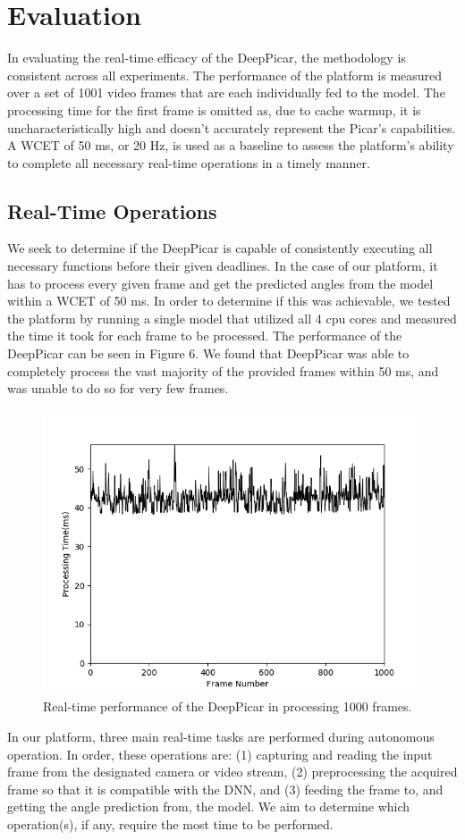 
\section{Evaluation}\label{sec:evaluation}

In evaluating the real-time efficacy of the DeepPicar, the methodology is consistent across all 
experiments. The performance of the platform is measured over a set of 1001 video frames that are 
each individually fed to the model. The processing time for the first frame is omitted as, due to 
cache warmup, it is uncharacteristically high and doesn't accurately represent the Picar's capabilities. 
A WCET of 50 ms, or 20 Hz, is used as a baseline to assess the platform's ability to complete all 
necessary real-time operations in a timely manner.

\subsection{Real-Time Operations}
We seek to determine if the DeepPicar is capable of consistently executing all necessary functions 
before their given deadlines. In the case of our platform, it has to process every given frame and get 
the predicted angles from the model within a WCET of 50 ms. In order to determine if this was achievable, 
we tested the platform by running a single model that utilized all 4 cpu cores and measured the time it 
took for each frame to be processed. The performance of the DeepPicar can be seen in Figure 6. We found 
that DeepPicar was able to completely process the vast majority of the provided frames within 50 ms, and 
was unable to do so for very few frames.

\begin{figure}[h]
  \centering
  \includegraphics[width=.5\textwidth]{Total_Processing_Time}
  \caption{ Real-time performance of the DeepPicar in processing 1000 frames.}
\end{figure}

In our platform, three main real-time tasks are performed during autonomous operation. In order, these 
operations are: (1) capturing and reading the input frame from the designated camera or video stream, 
(2) preprocessing the acquired frame so that it is compatible with the DNN, and (3) feeding the frame 
to, and getting the angle prediction from, the model. We aim to determine which operation(s), if any, 
require the most time to be performed.

